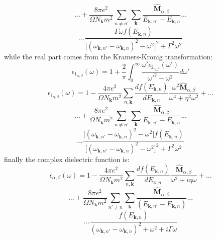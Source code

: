 \documentclass[twocolumn]{article}
\begin{document}
\begin{displaymath}
...+\frac{8 \pi e^2}{\Omega N_{\textbf{k}} m^2}\sum_{n\ne n'}\sum_{\textbf{k}}
\frac{\hat{\textbf{M}}_{\alpha,\beta}}{E_{\textbf{k},n'}-E_{\textbf{k},n}}...
\end{displaymath}
\begin{equation}
...\frac{\Gamma \omega f(E_{\textbf{k},n})}{\big[(\omega_{\textbf{k},n'}-\omega_{\textbf{k},n})^2-\omega^2\big]^2+\Gamma^2\omega^2}
\end{equation}
while the real part comes from the Kramers-Kronig transformation:
\begin{equation}
\epsilon_{1_{\alpha,\beta}}(\omega)=1+\frac{2}{\pi}\int_{0}^{\infty}\frac{\omega' \epsilon_{2_{\alpha,\beta}}(\omega')}
{\omega'^{2}-\omega^{2}}d\omega'
\end{equation}
\begin{displaymath}
\epsilon_{1_{\alpha,\beta}}(\omega)=1-\frac{4 \pi e^2}{\Omega N_{\textbf{k}} m^2}\sum_{n,\textbf{k}}
\frac{d f(E_{\textbf{k},n})}{d E_{\textbf{k},n}}\frac{\omega^2 \hat{\textbf{M}}_{\alpha,\beta}}
{\omega^4+\eta^2 \omega^2}+...
\end{displaymath}
\begin{displaymath}
...+\frac{8 \pi e^2}{\Omega N_{\textbf{k}} m^2}\sum_{n\ne n'}\sum_{\textbf{k}}
\frac{\hat{\textbf{M}}_{\alpha,\beta}}{E_{\textbf{k},n'}-E_{\textbf{k},n}}...
\end{displaymath}
\begin{equation}
...\frac{\big[(\omega_{\textbf{k},n'}-\omega_{\textbf{k},n})^2-\omega^2\big]f(E_{\textbf{k},n})}
{\big[(\omega_{\textbf{k},n'}-\omega_{\textbf{k},n})^2
-\omega^2\big]^2+\Gamma^2\omega^2}
\end{equation}
finally the complex dielectric function is:
\begin{displaymath}
\epsilon_{\alpha,\beta}(\omega)=1-\frac{4 \pi e^2}{\Omega N_{\textbf{k}} m^2}\sum_{n,\textbf{k}}
\frac{d f(E_{\textbf{k},n})}{d E_{\textbf{k},n}}\frac{\hat{\textbf{M}}_{\alpha,\beta}}
{\omega^2+i\eta\omega}+...
\end{displaymath}
\begin{displaymath}
...+\frac{8 \pi e^2}{\Omega N_{\textbf{k}} m^2}\sum_{n'\ne n}\sum_{\textbf{k}}
\frac{\hat{\textbf{M}}_{\alpha,\beta}}{(E_{\textbf{k},n'}-E_{\textbf{k},n})}...
\end{displaymath}
\begin{displaymath}
...\frac{f(E_{\textbf{k},n})}{(\omega_{\textbf{k},n'}-\omega_{\textbf{k},n})^2+\omega^2+i\Gamma\omega}
\end{displaymath}
\end{document}
